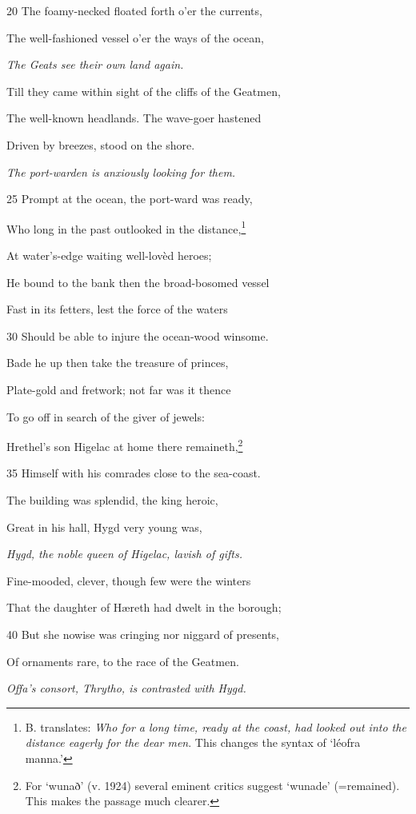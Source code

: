 20
The foamy-necked floated forth o’er the currents,

The well-fashioned vessel o’er the ways of the ocean,

\emph{The Geats see
their own land
again.}

Till they came within sight of the cliffs of the Geatmen,

The well-known headlands. The wave-goer hastened

Driven by breezes, stood on the shore.

\emph{The port-warden is
anxiously looking
for them.}

25
Prompt at the ocean, the port-ward was ready,

Who long in the past outlooked in the distance,\footnote{B. translates: \emph{Who for a long time, ready at the coast, had looked out into
the distance eagerly for the dear men}. This changes the syntax of ‘léofra
manna.’}

At water’s-edge waiting well-lovèd heroes;

He bound to the bank then the broad-bosomed vessel

Fast in its fetters, lest the force of the waters

30
Should be able to injure the ocean-wood winsome.

Bade he up then take the treasure of princes,

Plate-gold and fretwork; not far was it thence

To go off in search of the giver of jewels:

Hrethel’s son Higelac at home there remaineth,\footnote{For ‘wunað’ (v. 1924) several eminent critics suggest ‘wunade’ (=remained).
This makes the passage much clearer.}

35
Himself with his comrades close to the sea-coast.

The building was splendid, the king heroic,

Great in his hall, Hygd very young was,

\emph{Hygd, the noble
queen of Higelac,
lavish of gifts.}

Fine-mooded, clever, though few were the winters

That the daughter of Hæreth had dwelt in the borough;

40
But she nowise was cringing nor niggard of presents,

Of ornaments rare, to the race of the Geatmen.

\emph{Offa’s consort,
Thrytho, is contrasted
with Hygd.}

